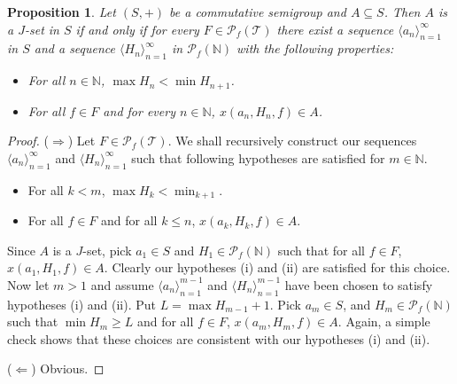 \documentclass[12pt]{article}
\theoremstyle{plain}
\newtheorem{prop}[thm]{Proposition}
\theoremstyle{definition}
\newcommand{\la}{\langle}
\newcommand{\ra}{\rangle}
\newcommand{\bbN}{\mathbb{N}}
\newcommand{\calT}{\mathcal{T}}
\newcommand{\Pf}{\mathcal{P}_f}
\begin{document}
\begin{prop}
  Let $(S, +)$ be a commutative semigroup and $A \subseteq S$.
  Then $A$ is a $J$-set in $S$ if and only if for every $F \in
  \Pf(\calT)$ there exist a sequence $\la a_n \ra_{n=1}^\infty$ in $S$
  and a sequence $\la H_n \ra_{n=1}^\infty$ in $\Pf(\bbN)$ with the
  following properties:
  \begin{itemize}
    \item[(1)] For all $n \in \bbN$, $\max H_n < \min H_{n+1}$. 

    \item[(2)] For all $f \in F$ and for every $n \in \bbN$, $x(a_n,
      H_n, f) \in A$.
  \end{itemize}
\end{prop}
\begin{proof}
  ($\Rightarrow$)
  Let $F \in \Pf(\calT)$.
  We shall recursively construct our sequences $\la a_n
  \ra_{n=1}^\infty$ and $\la H_n \ra_{n=1}^\infty$ such that following
  hypotheses are satisfied for $m\in \bbN$.
  \begin{itemize}
    \item[(i)] For all $k < m$, $\max H_k < \min_{k+1}$.
    \item[(ii)] For all $f \in F$ and for all $k \le n$, $x(a_k, H_k,
    f) \in A$.
  \end{itemize}
  
  Since $A$ is a $J$-set, pick $a_1 \in S$ and $H_1 \in \Pf(\bbN)$
  such that for all $f \in F$, $x(a_1, H_1, f) \in A$. 
  Clearly our hypotheses (i) and (ii) are satisfied for this choice.
  Now let $m > 1$ and assume $\la a_n \ra_{n=1}^{m-1}$ and $\la H_n
  \ra_{n=1}^{m-1}$ have been chosen to satisfy hypotheses (i) and
  (ii).
  Put $L = \max H_{m-1} + 1$. 
  Pick $a_m \in S$, and $H_m \in \Pf(\bbN)$ such that $\min H_m \ge L$
  and for all $f \in F$, $x(a_m, H_m, f) \in A$.
  Again, a simple check shows that these choices are consistent with
  our hypotheses (i) and (ii).

  ($\Leftarrow$) Obvious.
\end{proof}
\end{document}
